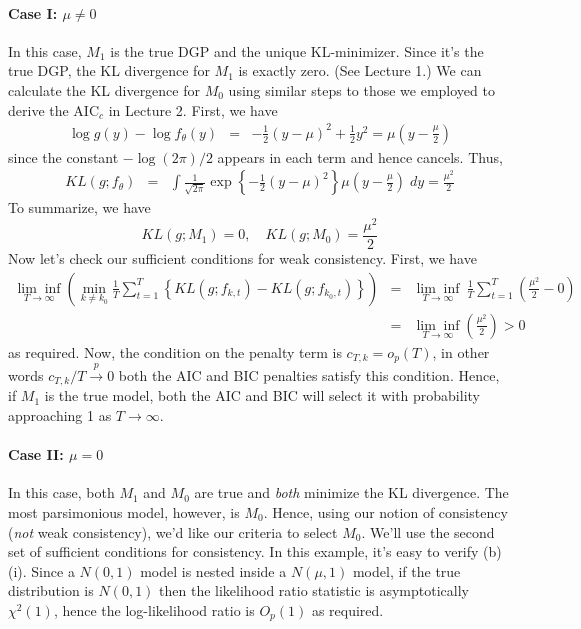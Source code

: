 \paragraph{Case I: $\mu \neq 0$} In this case, $M_1$ is the true DGP and the unique KL-minimizer. Since it's the true DGP, the KL divergence for $M_1$ is exactly zero. (See Lecture 1.) We can calculate the KL divergence for $M_0$ using similar steps to those we employed to derive the AIC$_c$ in Lecture 2. First, we have
	\begin{eqnarray*}
		\log g(y) - \log f_\theta(y) &=& -\frac{1}{2}(y-\mu)^2 + \frac{1}{2} y^2 =  \mu \left(y - \frac{\mu}{2}\right)
	\end{eqnarray*}
since the constant $-\log(2\pi)/2$ appears in each term and hence cancels. Thus,
	\begin{eqnarray*}
		KL(g;f_\theta) &=& \int \frac{1}{\sqrt{2\pi}} \exp\left\{ -\frac{1}{2} (y-\mu)^2\right\} \mu\left(y - \frac{\mu}{2} \right)\; dy 
			= \frac{\mu^2}{2}
	\end{eqnarray*}
To summarize, we have
\[
		KL(g;M_1) = 0, \quad
		KL(g;M_0) = \frac{\mu^2}{2}
  \]
Now let's check our sufficient conditions for weak consistency. First, we have
	\begin{eqnarray*}
		\underset{T\rightarrow \infty}{\lim\inf}\left(\underset{k \neq k_0}{\min} \frac{1}{T}\sum_{t = 1}^T \left\{ KL(g; f_{k,t}) - KL(g;f_{k_0,t}) \right\} \right) &=& \underset{T\rightarrow \infty}{\lim\inf}\ \frac{1}{T}\sum_{t = 1}^T  \left(\frac{\mu^2}{2} - 0\right) \\
		&=&  \underset{T\rightarrow \infty}{\lim\inf}\left(\frac{\mu^2}{2}\right) >0
	\end{eqnarray*}
as required. Now, the condition on the penalty term is $c_{T,k} = o_p(T)$, in other words $c_{T,k}/T \overset{p}{\rightarrow} 0$ both the AIC and BIC penalties satisfy this condition. Hence, if $M_1$ is the true model, both the AIC and BIC will select it with probability approaching 1 as $T\rightarrow \infty$.

\paragraph{Case II: $\mu = 0$} In this case, both $M_1$ and $M_0$ are true and \emph{both} minimize the KL divergence. The most parsimonious model, however, is $M_0$. Hence, using our notion of consistency (\emph{not} weak consistency), we'd like our criteria to select $M_0$. We'll use the second set of sufficient conditions for consistency. In this example, it's easy to verify (b)(i). Since a $N(0,1)$ model is nested inside a $N(\mu,1)$ model, if the true distribution is $N(0,1)$ then the likelihood ratio statistic is asymptotically $\chi^2(1)$, hence the log-likelihood ratio is $O_p(1)$ as required. 

